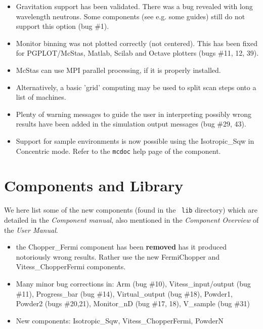 \begin{itemize}
\item Gravitation support has been validated. There was a bug revealed with long wavelength neutrons. Some components (see e.g. some guides) still do not support this option (bug \#1).
\item Monitor binning was not plotted correctly (not centered). This has been fixed for PGPLOT/McStas, Matlab, Scilab and Octave plotters (bugs \#11, 12, 39).

\item McStas can use MPI parallel processing, if it is properly installed.
\item Alternatively, a basic 'grid' computing may be used to split scan steps onto a list of machines.

\item Plenty of warning messages to guide the user in interpreting possibly wrong results have been added in the simulation output messages (bug \#29, 43).
\item Support for sample environments is now possible using the
  Isotropic\_Sqw in Concentric mode. Refer to the \verb+mcdoc+ help
  page of the component.

\end{itemize}


\section{Components and Library}
\label{s:new-features:components}
 

We here list some of the new components (found in the \MCS\ \verb+lib+ directory)
which are detailed in the {\it Component manual}, also mentioned in
the {\it Component Overview} of the {\it User Manual}.

\begin{itemize}
\item the Chopper\_Fermi component has been {\bf removed} has it produced notoriously wrong results. Rather use the new FermiChopper and Vitess\_ChopperFermi components.
\item Many minor bug corrections in:
Arm (bug \#10),
Vitess\_input/output (bug \#11),
Progress\_bar (bug \#14),
Virtual\_output (bug \#18),
Powder1, Powder2 (bugs \#20,21),
Monitor\_nD (bug \#17, 18),
V\_sample (bug \#31)
\item New components:
Isotropic\_Sqw,
Vitess\_ChopperFermi,
PowderN
\end{itemize}

